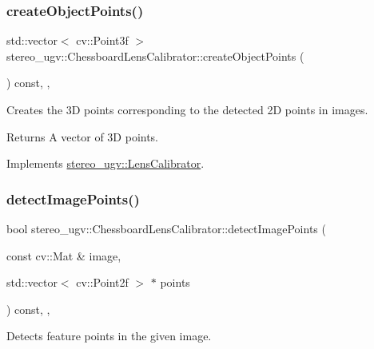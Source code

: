 \subsubsection{\texorpdfstring{create\+Object\+Points()}{createObjectPoints()}}
{\footnotesize\ttfamily std\+::vector$<$ cv\+::\+Point3f $>$ stereo\+\_\+ugv\+::\+Chessboard\+Lens\+Calibrator\+::create\+Object\+Points (\begin{DoxyParamCaption}{ }\end{DoxyParamCaption}) const\hspace{0.3cm}{\ttfamily [override]}, {\ttfamily [protected]}, {\ttfamily [virtual]}}



Creates the 3D points corresponding to the detected 2D points in images. 

\begin{DoxyReturn}{Returns}
A vector of 3D points. 
\end{DoxyReturn}


Implements \hyperlink{classstereo__ugv_1_1LensCalibrator_a3edf81dfc9567904a0d1a7c3555d65bf}{stereo\+\_\+ugv\+::\+Lens\+Calibrator}.

\mbox{\label{classstereo__ugv_1_1ChessboardLensCalibrator_ac6e93519a72d4218bcb1f9a49a9c22eb}} 
\subsubsection{\texorpdfstring{detect\+Image\+Points()}{detectImagePoints()}}
{\footnotesize\ttfamily bool stereo\+\_\+ugv\+::\+Chessboard\+Lens\+Calibrator\+::detect\+Image\+Points (\begin{DoxyParamCaption}\item[{const cv\+::\+Mat \&}]{image,  }\item[{std\+::vector$<$ cv\+::\+Point2f $>$ $\ast$}]{points }\end{DoxyParamCaption}) const\hspace{0.3cm}{\ttfamily [override]}, {\ttfamily [protected]}, {\ttfamily [virtual]}}



Detects feature points in the given image. 

